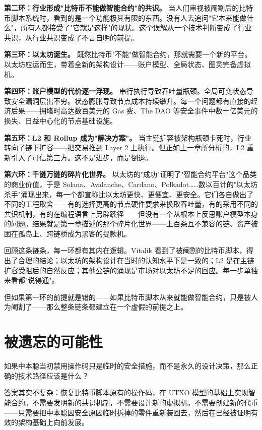 \documentclass[a4paper,12pt,openany]{ctexbook}
\begin{document}
\textbf{第二环：行业形成"比特币不能做智能合约"的共识。} 当人们审视被阉割后的比特币脚本系统时，看到的是一个功能极其有限的东西。没有人去追问"它本来能做什么"，所有人都接受了"它就是这样"的现状。这个误解从一个技术判断变成了行业共识，从行业共识变成了不言自明的前提。

\textbf{第三环：以太坊诞生。} 既然比特币"不能"做智能合约，那就需要一个新的平台。以太坊应运而生，带着全新的架构设计——账户模型、全局状态、图灵完备虚拟机。

\textbf{第四环：账户模型的代价逐一浮现。} 串行执行导致吞吐量瓶颈。全局可变状态导致安全漏洞层出不穷。状态膨胀导致节点成本持续攀升。每一个问题都有直接的经济后果——拥堵时高达数百美元的 Gas 费、The DAO 等安全事件中数十亿美元的损失、日益中心化的节点基础设施。

\textbf{第五环：L2 和 Rollup 成为"解决方案"。} 当主链扩容被架构瓶颈卡死时，行业转向了链下扩容——把交易推到 Layer 2 上执行。但正如上一章所分析的，L2 重新引入了可信第三方。这不是进步，而是倒退。

\textbf{第六环：千链万链的碎片化世界。} 以太坊的"成功"证明了"智能合约平台"这个品类的商业价值，于是 Solana、Avalanche、Cardano、Polkadot……数以百计的"以太坊杀手"涌现出来，每一个都宣称比以太坊更快、更便宜、更安全。它们各自做出了不同的工程取舍——有的选择更高的节点硬件要求来换取吞吐量，有的采用不同的共识机制，有的在编程语言上另辟蹊径——但没有一个从根本上反思账户模型本身的问题。结果就是第一章描述的那个碎片化世界——上百条互不兼容的链、资产被困在孤岛上、跨链桥成为黑客的提款机。

回顾这条链条，每一环都有其内在逻辑。Vitalik 看到了被阉割的比特币脚本，得出了合理的结论；以太坊的架构设计在当时的认知水平下是一致的；L2 是在主链扩容受阻后的自然反应；其他公链的涌现是市场对以太坊不足的回应。每一步单独来看都"说得通"。

但如果第一环的前提就是错的——如果比特币脚本从来就能做智能合约，只是被人为阉割了——那么整条链条都建立在一个虚假的前提之上。


\section*{被遗忘的可能性}


如果中本聪当初禁用操作码只是临时的安全措施，而不是永久的设计决策，那么正确的技术路径应该是什么？

答案其实不复杂：恢复比特币脚本原有的操作码，在 UTXO 模型的基础上实现智能合约。不需要发明新的共识机制，不需要设计新的虚拟机，不需要创建新的代币——只需要把中本聪因安全原因临时拆掉的零件重新装回去，然后在已经被证明有效的架构基础上向前发展。
\end{document}
